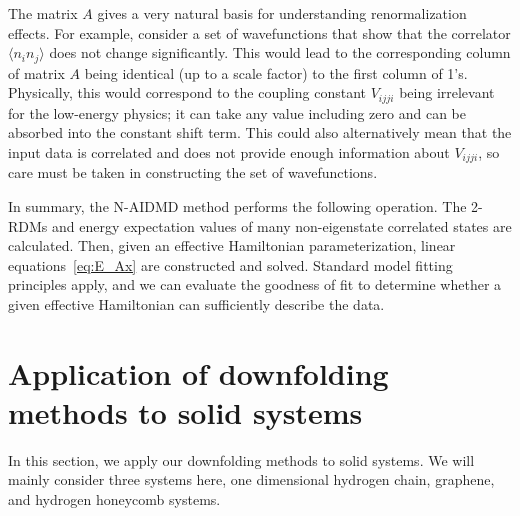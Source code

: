 \documentclass[aps, prb]{revtex4-1}
\begin{document}
The matrix $A$ gives a very natural basis for understanding renormalization effects.
For example, consider a set of wavefunctions that show that the correlator 
$\langle n_i n_j \rangle$ does not change significantly. This would lead to the 
corresponding column of matrix $A$ being identical (up to a scale factor) 
to the first column of 1's. Physically, this would correspond to the coupling constant 
$V_{ijji}$ being irrelevant for the low-energy physics; 
it can take any value including zero 
and can be absorbed into the constant shift term. 
This could also alternatively mean that the input 
data is correlated and does not provide enough information about $V_{ijji}$, so care must be taken in constructing the set of wavefunctions.

In summary, the N-AIDMD method performs the following operation. 
The  2-RDMs and energy expectation values of many non-eigenstate correlated states are calculated.
Then, given an effective Hamiltonian parameterization, linear equations~\eqref{eq:E_Ax} are 
constructed and solved. Standard model fitting principles apply, and we can 
evaluate the goodness of fit to determine whether a given effective Hamiltonian 
can sufficiently describe the data.


\section{Application of downfolding methods to solid systems}
In this section, we apply our downfolding methods to solid systems. We will mainly consider three systems here, one dimensional hydrogen chain, graphene, and hydrogen honeycomb systems. 
\end{document}
